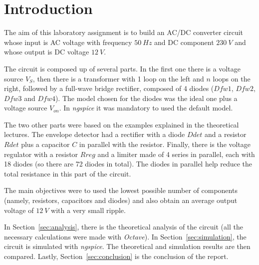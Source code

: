 \section{Introduction}
\label{sec:introduction}


The aim of this laboratory assignment is to build an AC/DC converter circuit whose input is AC voltage with frequency $50 \ Hz$ and DC component $230 \ V$ and whose output is DC voltage $12 \ V$.


The circuit is composed up of several parts. In the first one there is a voltage source $V_S$, then there is a transformer with 1 loop on the left and $n$ loops on the right, followed by a full-wave bridge rectifier, composed of 4 diodes ($Dfw1$, $Dfw2$, $Dfw3$ and $Dfw4$). The model chosen for the diodes was the ideal one plus a voltage source $V_{on}$. In \textit{ngspice} it was mandatory to used the default model.

The two other parts were based on the examples explained in the theoretical lectures. The envelope detector had a rectifier with a diode $Ddet$ and a resistor $Rdet$ plus a capacitor $C$ in parallel with the resistor. Finally, there is the voltage regulator with a resistor $Rreg$ and a limiter made  of 4 series in parallel, each with 18 diodes (so there are 72 diodes in total). The diodes in parallel help reduce the total resistance in this part of the circuit.


The main objectives were to used the lowest possible number of components (namely, resistors, capacitors and diodes) and also obtain an average output voltage of $12 \ V$ with a very small ripple.


In Section~\ref{sec:analysis}, there is the theoretical analysis of the circuit (all the necessary calculations were made with \textit{Octave}). In Section~\ref{sec:simulation}, the circuit is simulated with \textit{ngspice}. The theoretical and simulation results are then compared. Lastly,  Section~\ref{sec:conclusion} is the conclusion of the report. 
